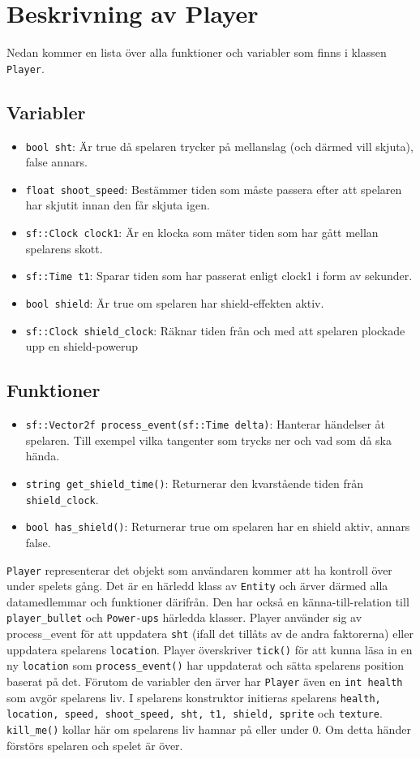 \documentclass{TDP003mall}
\begin{document}
\section{Beskrivning av Player}
Nedan kommer en lista över alla funktioner och variabler som finns i klassen \texttt{Player}.
\subsection{Variabler}
\begin{itemize}
\item \texttt{bool sht}: Är true då spelaren trycker på mellanslag (och därmed vill skjuta), false annars.
\item \texttt{float shoot\_speed}: Bestämmer tiden som måste passera efter att spelaren har skjutit innan den får skjuta igen.
\item \texttt{sf::Clock clock1}: Är en klocka som mäter tiden som har gått mellan spelarens skott.
\item \texttt{sf::Time t1}: Sparar tiden som har passerat enligt clock1 i form av sekunder.
\item \texttt{bool shield}: Är true om spelaren har shield-effekten aktiv.
\item \texttt{sf::Clock shield\_clock}: Räknar tiden från och med att spelaren plockade upp en shield-powerup
\end{itemize}

\subsection{Funktioner}
\begin{itemize}
\item \texttt{sf::Vector2f process\_event(sf::Time delta)}: Hanterar händelser åt spelaren. Till exempel vilka tangenter som trycks ner och vad som då ska hända.
\item \texttt{string get\_shield\_time()}: Returnerar den kvarstående tiden från \texttt{shield\_clock}.
\item \texttt{bool has\_shield()}: Returnerar true om spelaren har en shield aktiv, annars false.
\end{itemize}

\texttt{Player} representerar det objekt som användaren kommer att ha kontroll över under spelets gång. 
Det är en härledd klass av \texttt{Entity} och ärver därmed alla datamedlemmar och funktioner därifrån. 
Den har också en känna-till-relation till \texttt{player\_bullet} och \texttt{Power-ups} härledda klasser.
Player använder sig av process\_event för att uppdatera \texttt{sht} (ifall det tillåts av de andra faktorerna)  eller uppdatera spelarens \texttt{location}. 
Player överskriver \texttt{tick()} för att kunna läsa in en ny \texttt{location} som \texttt{process\_event()} har uppdaterat och sätta spelarens position baserat på det.
Förutom de variabler den ärver har \texttt{Player} även en \texttt{int health} som avgör spelarens liv. 
I spelarens konstruktor initieras spelarens \texttt{health, location, speed, shoot\_speed, sht, t1, shield, sprite} och \texttt{texture}.
\texttt{kill\_me()} kollar här om spelarens liv hamnar på eller under 0. Om detta händer förstörs spelaren och spelet är över.
\end{document}
